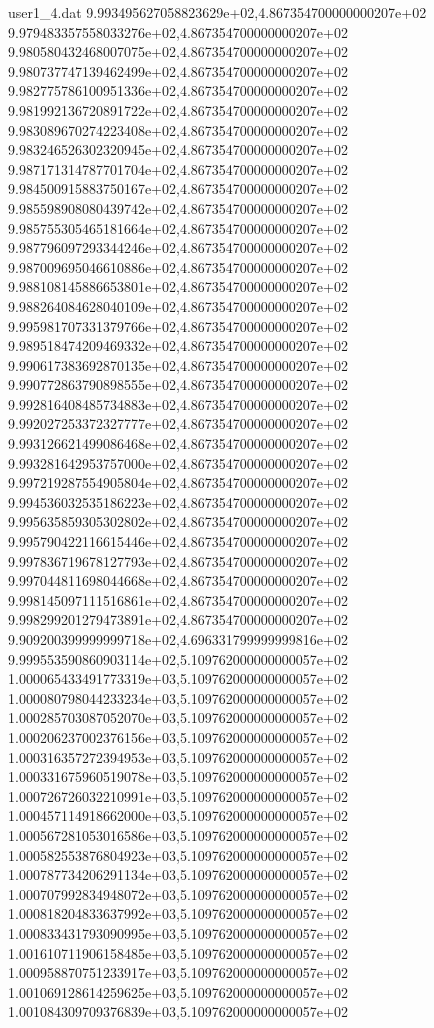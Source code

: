 \begin{filecontents}{user1_4.dat}
9.993495627058823629e+02,4.867354700000000207e+02
9.979483357558033276e+02,4.867354700000000207e+02
9.980580432468007075e+02,4.867354700000000207e+02
9.980737747139462499e+02,4.867354700000000207e+02
9.982775786100951336e+02,4.867354700000000207e+02
9.981992136720891722e+02,4.867354700000000207e+02
9.983089670274223408e+02,4.867354700000000207e+02
9.983246526302320945e+02,4.867354700000000207e+02
9.987171314787701704e+02,4.867354700000000207e+02
9.984500915883750167e+02,4.867354700000000207e+02
9.985598908080439742e+02,4.867354700000000207e+02
9.985755305465181664e+02,4.867354700000000207e+02
9.987796097293344246e+02,4.867354700000000207e+02
9.987009695046610886e+02,4.867354700000000207e+02
9.988108145886653801e+02,4.867354700000000207e+02
9.988264084628040109e+02,4.867354700000000207e+02
9.995981707331379766e+02,4.867354700000000207e+02
9.989518474209469332e+02,4.867354700000000207e+02
9.990617383692870135e+02,4.867354700000000207e+02
9.990772863790898555e+02,4.867354700000000207e+02
9.992816408485734883e+02,4.867354700000000207e+02
9.992027253372327777e+02,4.867354700000000207e+02
9.993126621499086468e+02,4.867354700000000207e+02
9.993281642953757000e+02,4.867354700000000207e+02
9.997219287554905804e+02,4.867354700000000207e+02
9.994536032535186223e+02,4.867354700000000207e+02
9.995635859305302802e+02,4.867354700000000207e+02
9.995790422116615446e+02,4.867354700000000207e+02
9.997836719678127793e+02,4.867354700000000207e+02
9.997044811698044668e+02,4.867354700000000207e+02
9.998145097111516861e+02,4.867354700000000207e+02
9.998299201279473891e+02,4.867354700000000207e+02
9.909200399999999718e+02,4.696331799999999816e+02
9.999553590860903114e+02,5.109762000000000057e+02
1.000065433491773319e+03,5.109762000000000057e+02
1.000080798044233234e+03,5.109762000000000057e+02
1.000285703087052070e+03,5.109762000000000057e+02
1.000206237002376156e+03,5.109762000000000057e+02
1.000316357272394953e+03,5.109762000000000057e+02
1.000331675960519078e+03,5.109762000000000057e+02
1.000726726032210991e+03,5.109762000000000057e+02
1.000457114918662000e+03,5.109762000000000057e+02
1.000567281053016586e+03,5.109762000000000057e+02
1.000582553876804923e+03,5.109762000000000057e+02
1.000787734206291134e+03,5.109762000000000057e+02
1.000707992834948072e+03,5.109762000000000057e+02
1.000818204833637992e+03,5.109762000000000057e+02
1.000833431793090995e+03,5.109762000000000057e+02
1.001610711906158485e+03,5.109762000000000057e+02
1.000958870751233917e+03,5.109762000000000057e+02
1.001069128614259625e+03,5.109762000000000057e+02
1.001084309709376839e+03,5.109762000000000057e+02

\end{filecontents}
